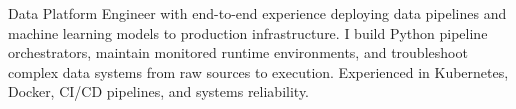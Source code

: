 \begin{cvparagraph}

Data Platform Engineer with end-to-end experience deploying data pipelines and machine learning models to production infrastructure. I build Python pipeline orchestrators, maintain monitored runtime environments, and troubleshoot complex data systems from raw sources to execution. Experienced in Kubernetes, Docker, CI/CD pipelines, and systems reliability.

\end{cvparagraph}
